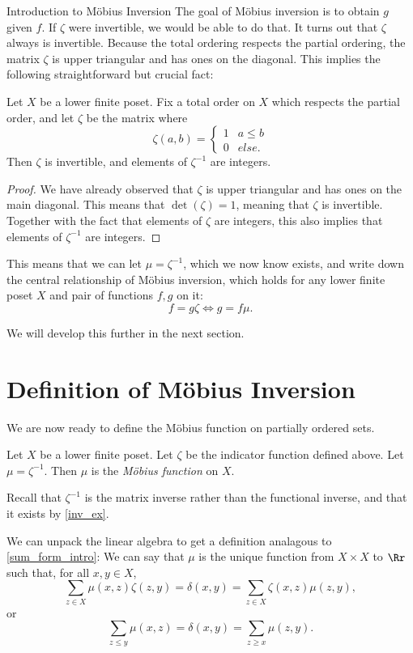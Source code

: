 \documentclass[12pt]{pom_thesis}
\begin{document}
\begin{chapter}{Introduction to M\"obius Inversion}
The goal of M\"obius inversion is to obtain $g$ given $f$. If $\zeta$ were invertible, we would be able to do that. It turns out that $\zeta$ always is invertible. Because the total ordering respects the partial ordering, the matrix $\zeta$ is upper triangular and has ones on the diagonal. This implies the following straightforward but crucial fact:
\begin{lemma}\label{inv_ex}
Let $X$ be a lower finite poset. Fix a total order on $X$ which respects the partial order, and let $\zeta$ be the matrix where 
\[
\zeta(a,b) = \begin{cases}1 & a \leq b \\ 0 & else. \end{cases}
\]
Then $\zeta$ is invertible, and elements of $\zeta^{-1}$ are integers.
\end{lemma}
\begin{proof}
We have already observed that $\zeta$ is upper triangular and has ones on the main diagonal. This means that $\det(\zeta) = 1$, meaning that $\zeta$ is invertible. Together with the fact that elements of $\zeta$ are integers, this also implies that elements of $\zeta^{-1}$ are integers.
\end{proof}

This means that we can let $\mu=\zeta^{-1}$, which we now know exists, and write down the central relationship of M\"obius inversion, which holds for any lower finite poset $X$ and pair of functions $f,g$ on it:
\[
f = g \zeta \iff g = f \mu.
\]

We will develop this further in the next section.

\section{Definition of M\"obius Inversion}
We are now ready to define the M\"obius function on partially ordered sets.
\begin{defn}\label{def_mob_pos}
Let $X$ be a lower finite poset. Let $\zeta$ be the indicator function defined above. Let $\mu = \zeta^{-1}$. Then $\mu$ is the \emph{M\"obius function} on $X$.
\end{defn}
\begin{rmk}
Recall that $\zeta^{-1}$ is the matrix inverse rather than the functional inverse, and that it exists by \ref{inv_ex}.
\end{rmk}
\begin{rmk}\label{sum_form}
We can unpack the linear algebra to get a definition analagous to \eqref{sum_form_intro}: We can say that $\mu$ is the unique function from $X\times X$ to $\Rr$ such that, for all $x,y \in X$,
\[
\sum_{z \in X} \mu(x,z)\zeta(z,y) = \delta(x,y) = \sum_{z \in X} \zeta(x,z)\mu(z,y),
\]
or
\[
\sum_{z \leq y} \mu(x,z) = \delta(x,y) = \sum_{z \geq x} \mu(z,y).
\]
\end{rmk}


\end{chapter}
\end{document}

